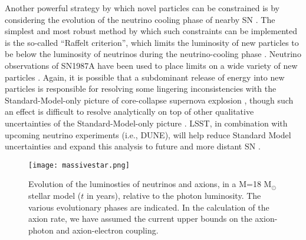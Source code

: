 Another powerful strategy by which novel particles can be constrained is by considering the evolution of the neutrino cooling phase of nearby SN  \citep[\ie, SN1987A][]{Burrows:1988, Raffelt:1988}.
The simplest and most robust method by which such constraints can be implemented is the so-called ``Raffelt criterion'', which limits the luminosity of new particles to be below the luminosity of neutrinos during the neutrino-cooling phase \citep{hep-ph/0611350}.
Neutrino observations of SN1987A have been used to place limits on a wide variety of new particles \citep{hep-ph/0207098, 1611.03864, 1611.05852, 1803.00993, 1808.10136}.
Again, it is possible that a subdominant release of energy into new particles is responsible for resolving some lingering inconsistencies with the Standard-Model-only picture of core-collapse supernova explosion \citep{0806.4273, 1805.07381}, though such an effect is difficult to resolve analytically on top of other qualitative uncertainties of the Standard-Model-only picture \citep{1809.05106, 1811.11178}.
LSST, in combination with upcoming neutrino experiments (i.e., DUNE), will help reduce Standard Model uncertainties and expand this analysis to future and more distant SN \citep{1807.10334}.

\begin{figure}[t]
\centering
\texttt{[image: massivestar.png]}
\caption{Evolution of the luminosties of neutrinos and axions, in a M=18 M$_\odot $ stellar model ($t$ in years), relative to the photon luminosity. The various evolutionary phases are indicated. 
In the calculation of the axion rate, we have assumed the current upper bounds on the axion-photon and axion-electron coupling.
}
\label{fig:massivestar}
\end{figure}

